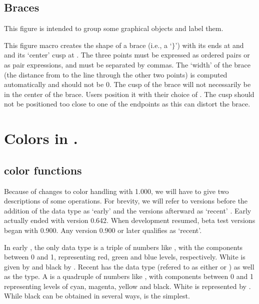 \documentclass[letterpaper]{article}
\begin{document}
\subsection{Braces}

This figure is intended to group some graphical objects and label them.

\begin{cd}
%
%
\end{cd}

This figure macro creates the shape of a brace (i.e., a `$\}$') with its
ends at  and  and its `center' cusp at
. The three points must be expressed as ordered pairs or as
\MF{} pair expressions, and must be separated by commas. The `width' of
the brace (the distance from  to the line through the other
two points) is computed automatically and should not be $0$. The cusp of
the brace will not necessarily be in the center of the brace. Users
position it with their choice of . The cusp should not be
positioned too close to one of the endpoints as this can distort the
brace.


\section{Colors in \mfp{}.}\label{colors}

\subsection{\CMP{} color functions}\label{mpcolors}

Because of changes to color handling with \MP{} 1.000, we will have to
give two descriptions of some operations. For brevity, we will refer to
\MP{} versions before the addition of the  data type as
`early' \MP{} and the versions afterward as `recent' \MP{}. Early \MP{}
actually ended with version 0.642. When development resumed, beta test
versions began with 0.900. Any version 0.900 or later qualifies as
`recent'.

In early \MP{}, the only  data type is a triple of numbers
like , with the components between 0 and 1, representing
red, green and blue levels, respectively. White is given by
 and black by . Recent \MP{} has the
 data type (refered to as either  or )
as well as the  type. A  is a quadruple of
numbers like , with components between 0 and 1
representing levels of cyan, magenta, yellow and black. White is
represented by . While black can be obtained in several
ways, is the simplest.
\end{document}
